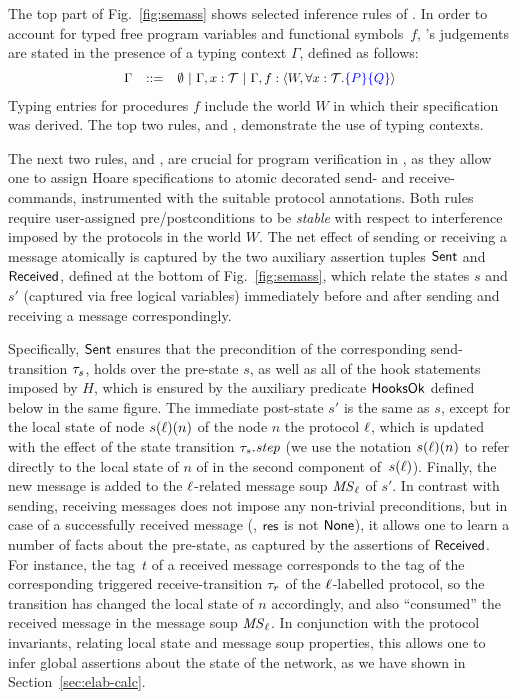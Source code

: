 The top part of Fig.~\ref{fig:semass} shows selected inference rules
of \disel.
%
In order to account for typed free program variables and functional
symbols~$f$, \disel's judgements are stated in the presence of a
typing context $\Gamma$, defined as follows:
%
\[
{\small{
\begin{array}{rcl}
  \Gamma & ::= & \emptyset ~|~ \Gamma, x: \mathcal{T}~|~ \Gamma, f: \langle{W,
                 \forall x: \mathcal{T}. \ensuremath{\textcolor{blue}{\left\{{P}\right\}}}\ensuremath{\textcolor{blue}{\left\{{Q}\right\}}}}\rangle
\end{array}
}}
\]
%
Typing entries for procedures $f$ include the world $W$ in which their
specification was derived. The top two rules,  and
, demonstrate the use of typing contexts.

The next two rules,  and , are
crucial for program verification in \disel, as they allow one to
assign Hoare specifications to atomic decorated send- and
receive-commands, instrumented with the suitable protocol
annotations. Both rules require user-assigned pre/postconditions to
be \emph{stable} with respect to interference imposed by the protocols
in the world $W$. The net effect of sending or receiving a message
atomically is captured by the two auxiliary assertion tuples
$\mathsf{Sent}$ and $\mathsf{Received}$, defined at the bottom of
Fig.~\ref{fig:semass}, which relate the states $s$ and $s'$ (captured
via free logical variables) immediately before and after sending and
receiving a message correspondingly.

Specifically, $\mathsf{Sent}$ ensures that the precondition of the
corresponding send-transition $\tau_s$, holds over the pre-state
$s$, as well as all of the hook statements imposed by $H$, which is
ensured by the auxiliary predicate $\mathsf{HooksOk}$ defined below in the
same figure. The immediate post-state $s'$ is the same as $s$, except
for the local state of node $s(\ell)(n)$ of the node $n$ \wrt the
protocol $\ell$, which is updated with the effect of the state
transition $\tau_s.\mathit{step}$ (we use the notation $s(\ell)(n)$ to
refer directly to the local state of $n$ of in the second component
of~$s(\ell)$). Finally, the new message is added to the $\ell$-related
message soup $\mathit{MS}_{\ell}$ of $s'$.
%
In contrast with sending, receiving messages does not impose any
non-trivial preconditions, but in case of a successfully received
message (\ie, $\mathsf{res}$ is not $\mathsf{None}$), it allows one to learn a number
of facts about the pre-state, as captured by the assertions of
$\mathsf{Received}$. For instance, the tag~$t$ of a received message
corresponds to the tag of the corresponding triggered
receive-transition $\tau_r$ of the $\ell$-labelled protocol, so the
transition has changed the local state of $n$ accordingly, and also
``consumed'' the received message in the message soup $\mathit{MS}_{\ell}$. In
conjunction with the protocol invariants, relating local state and
message soup properties, this allows one to infer global assertions
about the state of the network, as we have shown in
Section~\ref{sec:elab-calc}.

